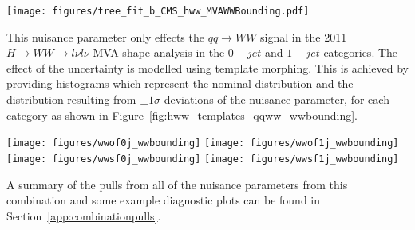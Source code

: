 \begin{figure*}[hbtp]
  \begin{center}
    	\texttt{[image: figures/tree\_fit\_b\_CMS\_hww\_MVAWWBounding.pdf]}
    \caption{Summary plots for the parameter \texttt{CMS\_hww\_MVAWWBounding}. 
The entries in the histograms are for fits to background only toys letting $\mu$ float freely\label{fig:combination_hww_wwbounding_b}.}
  \end{center}
\end{figure*}

This nuisance parameter only effects the $qq\rightarrow WW$ signal in the 2011 
$H\rightarrow WW \rightarrow l\nu l\nu$ MVA shape analysis in the $0-jet$ and $1-jet$ categories. The effect of the uncertainty 
is modelled using template morphing. This is achieved by providing histograms which represent the nominal distribution and 
the distribution resulting from $\pm1\sigma$ deviations of the nuisance parameter, for each category as shown in 
Figure~\ref{fig:hww_templates_qqww_wwbounding}. 

\begin{figure*}[hbtp]
  \begin{center}
    	\texttt{[image: figures/wwof0j\_wwbounding]}
    	\texttt{[image: figures/wwof1j\_wwbounding]}\\
    	\texttt{[image: figures/wwsf0j\_wwbounding]}
    	\texttt{[image: figures/wwsf1j\_wwbounding]}\\
    \caption{Templates representing the variation in MVA output shape of the $qq\rightarrow WW$ signal from the $H\rightarrow WW$ 2011 analysis resulting
from systematic variation of the parameter \texttt{CMS\_hww\_MVAWWBounding}. The upper left/right plots show the templates for the opposite flavour lepton
categories while the lower left/right plots show the same flavour lepton categories\label{fig:hww_templates_qqww_wwbounding}.}
  \end{center}
\end{figure*}

A summary of the pulls from all of the nuisance parameters from this combination and some example diagnostic plots can be found in Section~\ref{app:combinationpulls}.

